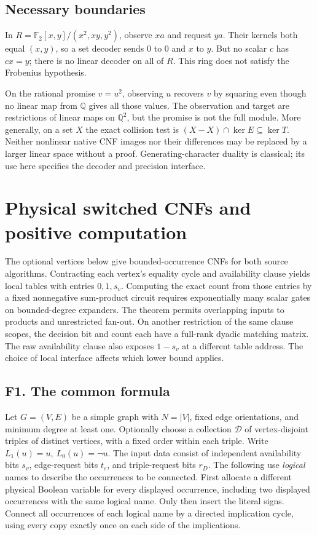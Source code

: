 \documentclass[11pt,a4paper]{article}
\begin{document}
\subsection{Necessary boundaries}\label{v8-necessary-boundaries}

In \(R=\mathbb F_2[x,y]/(x^2,xy,y^2)\), observe \(xa\) and request
\(ya\). Their kernels both equal \((x,y)\), so a set decoder sends \(0\)
to \(0\) and \(x\) to \(y\). But no scalar \(c\) has \(cx=y\); there is
no linear decoder on all of \(R\). This ring does not satisfy the
Frobenius hypothesis.

On the rational promise \(v=u^2\), observing \(u\) recovers \(v\) by
squaring even though no linear map from \(\mathbb Q\) gives all those
values. The observation and target are restrictions of linear maps on
\(\mathbb Q^2\), but the promise is not the full module. More generally,
on a set \(X\) the exact collision test is
\((X-X)\cap\ker E\subseteq\ker T\). Neither nonlinear native CNF images
nor their differences may be replaced by a larger linear space without a
proof. Generating-character duality is classical; its use here specifies
the decoder and precision interface.

\section{Physical switched CNFs and positive
computation}\label{v8-section-stronger-family}

The optional vertices below give bounded-occurrence CNFs for both source
algorithms. Contracting each vertex's equality cycle and availability
clause yields local tables with entries \(0,1,s_v\). Computing the exact
count from those entries by a fixed nonnegative sum-product circuit
requires exponentially many scalar gates on bounded-degree expanders.
The theorem permits overlapping inputs to products and unrestricted
fan-out. On another restriction of the same clause scopes, the decision
bit and count each have a full-rank dyadic matching matrix. The raw
availability clause also exposes \(1-s_v\) at a different table address.
The choice of local interface affects which lower bound applies.

\subsection{F1. The common formula}\label{v8-f1.-the-common-formula}

Let \(G=(V,E)\) be a simple graph with \(N=|V|\), fixed edge
orientations, and minimum degree at least one. Optionally choose a
collection \(\mathcal D\) of vertex-disjoint triples of distinct
vertices, with a fixed order within each triple. Write
\(L_1(u)=u,\ L_0(u)=\neg u\). The input data consist of independent
availability bits \(s_v\), edge-request bits \(t_e\), and triple-request
bits \(r_D\). The following use \emph{logical} names to describe the
occurrences to be connected. First allocate a different physical Boolean
variable for every displayed occurrence, including two displayed
occurrences with the same logical name. Only then insert the literal
signs. Connect all occurrences of each logical name by a directed
implication cycle, using every copy exactly once on each side of the
implications.
\end{document}
